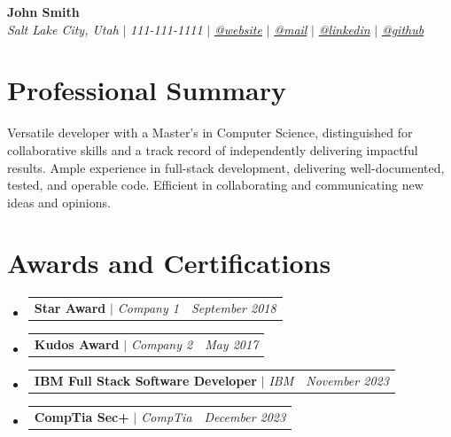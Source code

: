 \documentclass[letterpaper,10pt]{article}
\makeatletter
\newcommand{\sectionspace}{
\vspace{-20pt}
}
\newcommand{\subheadingtitlevspace}{
\vspace{-3pt}
}
\newcommand{\titleItem}[1]{
  \textbf{#1}
}
\newcommand{\resumeProjectHeading}[2]{
    \item
    \begin{tabular*}{0.97\textwidth}{l@{\extracolsep{\fill}}r}
      #1 & \textit{ #2} \\
    \end{tabular*}\vspace{-9pt}
}
\newcommand{\resumeSubHeadingListStart}{\subheadingtitlevspace\begin{itemize}[leftmargin=0.15in, label={}]}
\newcommand{\resumeSubHeadingListEnd}{\end{itemize}}
\makeatother
\begin{document}

\begin{flushleft}
    \textbf{\large John Smith} \\
    \textit{Salt Lake City, Utah} $|$
    \textit{111-111-1111} $|$
    \href{https://example.com}{{\textit{@website}}} $|$
    \href{mailto:john.smith@example.com}{{\textit{@mail}}} $|$
    \href{https://example.com/linkedin}{{\textit{@linkedin}}} $|$
    \href{https://example.com/github}{{\textit{@github}}}
    \vspace{-8pt}
\end{flushleft}


\section{Professional Summary}
\vspace{-3pt}
\begin{itemize}[leftmargin=0.15in, label={}]
    {\item{
     {Versatile developer with a Master's in Computer Science, distinguished for collaborative skills and a track record of independently delivering impactful results. Ample experience in full-stack development, delivering well-documented, tested, and operable code. Efficient in collaborating and communicating new ideas and opinions.} \\
    }}
 \end{itemize}
 \sectionspace



\section{Awards and Certifications}
    \resumeSubHeadingListStart
      \resumeProjectHeading
          {\titleItem{Star Award} \emph{ $|$ Company 1}}{September 2018}
      \resumeProjectHeading
          {\titleItem{Kudos Award} \emph{ $|$ Company 2}}{May 2017}
      \resumeProjectHeading
          {\titleItem{IBM Full Stack Software Developer} \emph{$|$ IBM}}{November 2023}
          \resumeProjectHeading
          {\titleItem{CompTia Sec+} \emph{$|$ CompTia}}{December 2023}
    \resumeSubHeadingListEnd
\end{document}
